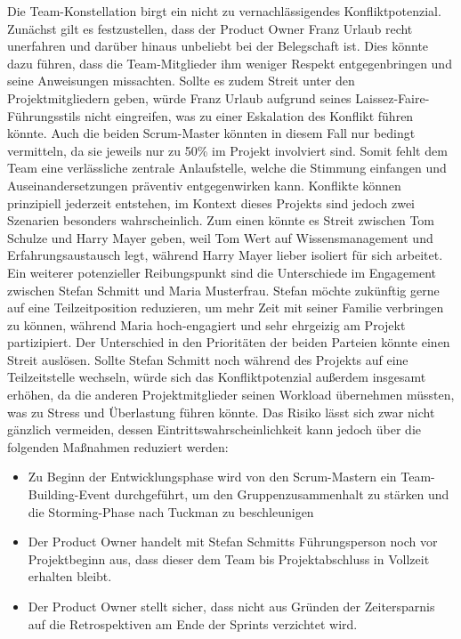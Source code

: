 Die Team-Konstellation birgt ein nicht zu vernachlässigendes Konfliktpotenzial. Zunächst gilt es festzustellen, dass der Product Owner Franz Urlaub recht unerfahren und darüber hinaus unbeliebt bei der Belegschaft ist. Dies könnte dazu führen, dass die Team-Mitglieder ihm weniger Respekt entgegenbringen und seine Anweisungen missachten. Sollte es zudem Streit unter den Projektmitgliedern geben, würde Franz Urlaub aufgrund seines Laissez-Faire-Führungsstils nicht eingreifen, was zu einer Eskalation des Konflikt führen könnte. Auch die beiden Scrum-Master könnten in diesem Fall nur bedingt vermitteln, da sie jeweils nur zu 50\% im Projekt involviert sind. Somit fehlt dem Team eine verlässliche zentrale Anlaufstelle, welche die Stimmung einfangen und Auseinandersetzungen präventiv entgegenwirken kann. Konflikte können prinzipiell jederzeit entstehen, im Kontext dieses Projekts sind jedoch zwei Szenarien besonders wahrscheinlich. Zum einen könnte es Streit zwischen Tom Schulze und Harry Mayer geben, weil Tom Wert auf Wissensmanagement und Erfahrungsaustausch legt, während Harry Mayer lieber isoliert für sich arbeitet. Ein weiterer potenzieller Reibungspunkt sind die Unterschiede im Engagement zwischen Stefan Schmitt und Maria Musterfrau. Stefan möchte zukünftig gerne auf eine Teilzeitposition reduzieren, um mehr Zeit mit seiner Familie verbringen zu können, während Maria hoch-engagiert und sehr ehrgeizig am Projekt partizipiert. Der Unterschied in den Prioritäten der beiden Parteien könnte einen Streit auslösen. Sollte Stefan Schmitt noch während des Projekts auf eine Teilzeitstelle wechseln, würde sich das Konfliktpotenzial außerdem insgesamt erhöhen, da die anderen Projektmitglieder seinen Workload übernehmen müssten, was zu Stress und Überlastung führen könnte. Das Risiko lässt sich zwar nicht gänzlich vermeiden, dessen Eintrittswahrscheinlichkeit kann jedoch über die folgenden Maßnahmen reduziert werden:
\begin{itemize}
	\item Zu Beginn der Entwicklungsphase wird von den Scrum-Mastern ein Team-Building-Event durchgeführt, um den Gruppenzusammenhalt zu stärken und die Storming-Phase nach Tuckman zu beschleunigen
	\item Der Product Owner handelt mit Stefan Schmitts Führungsperson noch vor Projektbeginn aus, dass dieser dem Team bis Projektabschluss in Vollzeit erhalten bleibt.
	\item Der Product Owner stellt sicher, dass nicht aus Gründen der Zeitersparnis auf die Retrospektiven am Ende der Sprints verzichtet wird.
\end{itemize}


